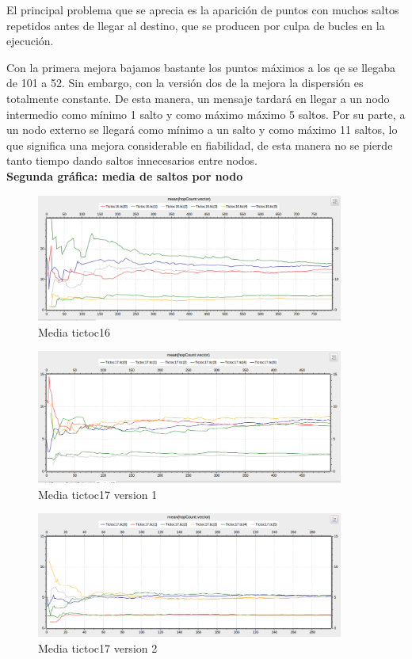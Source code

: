 \documentclass{article}
\begin{document}
		El principal problema que se aprecia es la aparición de puntos con muchos saltos repetidos antes de llegar al destino, que se producen por culpa de bucles en la ejecución. 
		
		Con la primera mejora bajamos bastante los puntos máximos a los qe se llegaba de 101 a 52. Sin embargo, con la versión dos de la mejora la dispersión es totalmente constante. De esta manera, un mensaje tardará en llegar a un nodo intermedio como mínimo 1 salto y como máximo máximo 5 saltos. Por su parte, a un nodo externo se llegará como mínimo a un salto y como máximo 11 saltos, lo que significa una mejora considerable en fiabilidad, de esta manera no se pierde tanto tiempo dando saltos innecesarios entre nodos.\\
		
		\textbf{Segunda gráfica: media de saltos por nodo}\\
		
		
		\begin{figure}[htb]
		\centering
		\includegraphics[width=0.9\textwidth]{tictoc16/figura2.png}
		\caption{Media tictoc16}
		\end {figure}
		\newpage
		
		\begin{figure}[htb]
		\centering
		\includegraphics[width=0.9\textwidth]{tictoc17v1/figura2.png}
		\caption{Media tictoc17 version 1}
		\end {figure}

		\begin{figure}[htb]
		\centering
		\includegraphics[width=0.9\textwidth]{tictoc17v2/figura2.png}
		\caption{Media tictoc17 version 2}
		\end {figure}
\end{document}
